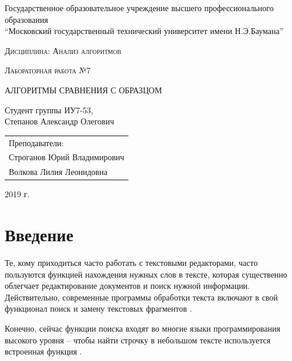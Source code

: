 \documentclass[a4paper,12pt]{article}
\newcommand{\anonsection}[1]{\section*{#1}\addcontentsline{toc}{section}{#1}}
\begin{document}
\begin{titlepage}

    \begin{center}
        \large
        Государственное образовательное учреждение высшего профессионального образования\\
        “Московский государственный технический университет имени Н.Э.Баумана”
        \vspace{3cm}

        \textsc{Дисциплина: Анализ алгоритмов}
        \vspace{0.5cm}

        \textsc{Лабораторная работа №7}
        \vspace{3cm}

        {\LARGE АЛГОРИТМЫ СРАВНЕНИЯ С ОБРАЗЦОМ}
        \vspace{3cm}

        Студент группы ИУ7-53,\\
        Степанов Александр Олегович
        \vfill
    \end{center}

    \begin{flushright}
        \begin{tabular}{l}
            Преподаватели:\\
            Строганов Юрий Владимирович\\
            Волкова Лилия Леонидовна
        \end{tabular}
    \end{flushright}

    \begin{center}

        2019 г.

    \end{center}

\end{titlepage}

\tableofcontents

\newpage
\anonsection{Введение}

Те, кому приходиться часто работать с текстовыми редакторами,
часто пользуются функцией нахождения нужных слов в тексте,
которая существенно облегчает редактирование документов и
поиск нужной информации. Действительно, современные программы
обработки текста включают в свой функционал поиск и замену
текстовых фрагментов \cite{office}.

Конечно, сейчас функции поиска входят во многие языки
программирования высокого уровня – чтобы найти строчку
в небольшом тексте используется встроенная функция \cite{python}.
\end{document}
